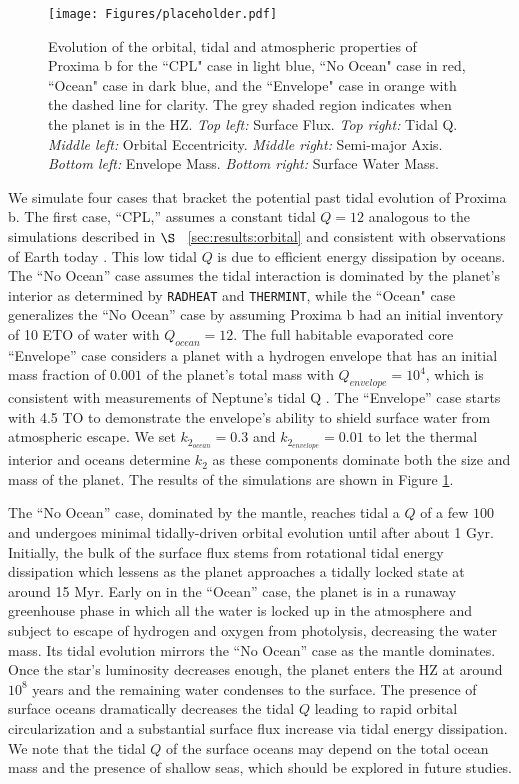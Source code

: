 \documentclass[preprint,12pt]{aastex}
\def\radheat{\texttt{\footnotesize{RADHEAT}}\xspace}
\def\thermint{\texttt{\footnotesize{THERMINT}}\xspace}
\begin{document}
\begin{figure}[ht]
\centering
\texttt{[image: Figures/placeholder.pdf]}
\caption{Evolution of the orbital, tidal and atmospheric properties of
  Proxima b for the ``CPL" case in light blue, ``No Ocean" case in
  red, ``Ocean" case in dark blue, and the ``Envelope" case in orange
  with the dashed line for clarity.  The grey shaded region indicates
  when the planet is in the HZ. {\it Top left:} Surface Flux. {\it Top
    right:} Tidal Q. {\it Middle left:} Orbital Eccentricity. {\it
    Middle right:} Semi-major Axis. {\it Bottom left:} Envelope
  Mass. {\it Bottom right:} Surface Water Mass.}
\label{fig:tidal_hec}
\end{figure}

We simulate four cases that bracket the potential
past tidal evolution of Proxima b.  The first case, ``CPL,'' assumes a
constant tidal $Q = 12$ analogous to the simulations described in
$\S$~ \ref{sec:results:orbital} and consistent with observations of
Earth today \citep{Dickey94,Williams78,Yoder95}.  This low tidal $Q$
is due to efficient energy dissipation by oceans.  The ``No Ocean''
case assumes the tidal interaction is dominated by the planet's
interior as determined by \radheat and \thermint, while the ``Ocean"
case generalizes the ``No Ocean'' case by assuming Proxima b had an
initial inventory of 10 ETO of water with $Q_{ocean} = 12$.  The full
habitable evaporated core ``Envelope'' case considers a planet with a
hydrogen envelope that has an initial mass fraction of $0.001$ of the
planet's total mass with $Q_{envelope} = 10^4$, which is consistent
with measurements of Neptune's tidal Q \citep{ZhangHamilton08}.  The
``Envelope'' case starts with 4.5 TO to demonstrate the envelope's
ability to shield surface water from atmospheric escape.  We set
$k_{2_{ocean}} = 0.3$ and $k_{2_{envelope}} = 0.01$ to let the thermal
interior and oceans determine $k_2$ as these components dominate both
the size and mass of the planet. The results of the simulations are
shown in Figure \ref{fig:tidal_hec}.

The ``No Ocean'' case, dominated by the mantle, reaches tidal a $Q$ of a few
$100$ and undergoes minimal tidally-driven orbital evolution until
after about 1 Gyr.  Initially, the bulk of the surface flux stems from
rotational tidal energy dissipation which lessens as the planet
approaches a tidally locked state at around 15 Myr. Early on in the
``Ocean'' case, the planet is in a runaway greenhouse phase in which all
the water is locked up in the atmosphere and subject to escape of
hydrogen and oxygen from photolysis, decreasing the water mass.  Its
tidal evolution mirrors the ``No Ocean'' case as the mantle dominates.
Once the star's luminosity decreases enough, the planet enters the HZ
at around $10^8$ years and the remaining water condenses to the
surface. The presence of surface oceans dramatically decreases the
tidal $Q$ leading to rapid orbital circularization and a substantial
surface flux increase via tidal energy dissipation.
We note that the tidal $Q$ of the surface oceans may depend on the 
total ocean mass and the presence of shallow seas, which should be explored in 
future studies.
\end{document}
